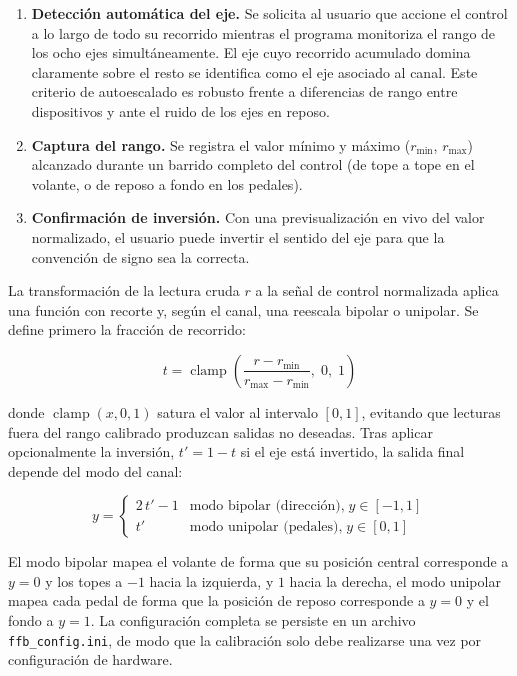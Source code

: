 \begin{enumerate}
    \item \textbf{Detección automática del eje.} Se solicita al usuario que accione el control a lo largo de todo su recorrido mientras el programa monitoriza el rango de los ocho ejes simultáneamente. El eje cuyo recorrido acumulado domina claramente sobre el resto se identifica como el eje asociado al canal. Este criterio de autoescalado es robusto frente a diferencias de rango entre dispositivos y ante el ruido de los ejes en reposo.
    \item \textbf{Captura del rango.} Se registra el valor mínimo y máximo ($r_\text{min}$, $r_\text{max}$) alcanzado durante un barrido completo del control (de tope a tope en el volante, o de reposo a fondo en los pedales).
    \item \textbf{Confirmación de inversión.} Con una previsualización en vivo del valor normalizado, el usuario puede invertir el sentido del eje para que la convención de signo sea la correcta.
\end{enumerate}

La transformación de la lectura cruda $r$ a la señal de control normalizada aplica una función con recorte y, según el canal, una reescala bipolar o unipolar. Se define primero la fracción de recorrido:

\begin{equation}
    t = \operatorname{clamp}\!\left(\frac{r - r_\text{min}}{r_\text{max} - r_\text{min}},\; 0,\; 1\right)
\end{equation}

donde $\operatorname{clamp}(x, 0, 1)$ satura el valor al intervalo $[0, 1]$, evitando que lecturas fuera del rango calibrado produzcan salidas no deseadas. Tras aplicar opcionalmente la inversión, $t' = 1 - t$ si el eje está invertido, la salida final depende del modo del canal:

\begin{equation}
    y =
    \begin{cases}
        2\,t' - 1 & \text{modo bipolar (dirección),}\; y \in [-1, 1] \\[4pt]
        t'        & \text{modo unipolar (pedales),}\; y \in [0, 1]
    \end{cases}
\end{equation}

El modo bipolar mapea el volante de forma que su posición central corresponde a $y = 0$ y los topes a $-1$ hacia la izquierda, y $1$ hacia la derecha, el modo unipolar mapea cada pedal de forma que la posición de reposo corresponde a $y=0$ y el fondo a $y=1$.  La configuración completa se persiste en un archivo \verb|ffb_config.ini|, de modo que la calibración solo debe realizarse una vez por configuración de hardware.\\
\newpage

